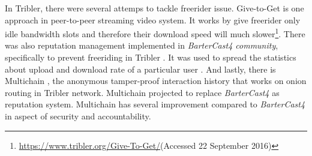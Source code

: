 In Tribler, there were several attemps to tackle freerider issue. Give-to-Get \cite{2008:givetogetvod:Mol} is one approach in peer-to-peer streaming video system. It works by give freerider only idle bandwidth slots and therefore their download speed will much slower\footnote{\url{https://www.tribler.org/Give-To-Get/}(Accessed 22 September 2016)}. There was also reputation management implemented in \textit{BarterCast4 community}, specifically to prevent freeriding in Tribler \cite{2009:bartercast:meulpolder}. It was used to spread the statistics about upload and download rate of a particular user \cite{2016:tribler-techdebt:vos}. And lastly, there is Multichain \cite{2015:multichain:norberhuis}, the anonymous tamper-proof interaction history that works on onion routing in Tribler network. Multichain projected to replace \textit{BarterCast4} as reputation system. Multichain has several improvement compared to \textit{BarterCast4} in aspect of security and accountability.

